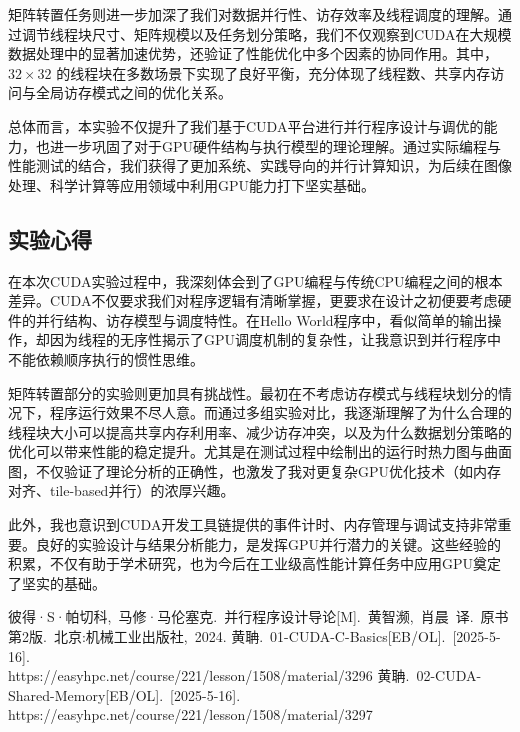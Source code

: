 \documentclass[a4paper, utf8]{ctexart}
\begin{document}
	矩阵转置任务则进一步加深了我们对数据并行性、访存效率及线程调度的理解。通过调节线程块尺寸、矩阵规模以及任务划分策略，我们不仅观察到CUDA在大规模数据处理中的显著加速优势，还验证了性能优化中多个因素的协同作用。其中，$32 \times 32$ 的线程块在多数场景下实现了良好平衡，充分体现了线程数、共享内存访问与全局访存模式之间的优化关系。
	
	总体而言，本实验不仅提升了我们基于CUDA平台进行并行程序设计与调优的能力，也进一步巩固了对于GPU硬件结构与执行模型的理论理解。通过实际编程与性能测试的结合，我们获得了更加系统、实践导向的并行计算知识，为后续在图像处理、科学计算等应用领域中利用GPU能力打下坚实基础。
	
	\subsection{实验心得}
	
	在本次CUDA实验过程中，我深刻体会到了GPU编程与传统CPU编程之间的根本差异。CUDA不仅要求我们对程序逻辑有清晰掌握，更要求在设计之初便要考虑硬件的并行结构、访存模型与调度特性。在Hello World程序中，看似简单的输出操作，却因为线程的无序性揭示了GPU调度机制的复杂性，让我意识到并行程序中不能依赖顺序执行的惯性思维。
	
	矩阵转置部分的实验则更加具有挑战性。最初在不考虑访存模式与线程块划分的情况下，程序运行效果不尽人意。而通过多组实验对比，我逐渐理解了为什么合理的线程块大小可以提高共享内存利用率、减少访存冲突，以及为什么数据划分策略的优化可以带来性能的稳定提升。尤其是在测试过程中绘制出的运行时热力图与曲面图，不仅验证了理论分析的正确性，也激发了我对更复杂GPU优化技术（如内存对齐、tile-based并行）的浓厚兴趣。
	
	此外，我也意识到CUDA开发工具链提供的事件计时、内存管理与调试支持非常重要。良好的实验设计与结果分析能力，是发挥GPU并行潜力的关键。这些经验的积累，不仅有助于学术研究，也为今后在工业级高性能计算任务中应用GPU奠定了坚实的基础。
	
	\let\cleardoublepage\clearpage
	
	\begin{thebibliography}{99}  
		 彼得·S·帕切科,\ 马修·马伦塞克.\ 并行程序设计导论[M].\ 黄智濒,\ 肖晨\ 译.\ 原书第2版.\ 北京:机械工业出版社,\ 2024.
		 黄聃.\ 01-CUDA-C-Basics[EB/OL].\ [2025-5-16].\\ https://easyhpc.net/course/221/lesson/1508/material/3296
		 黄聃.\ 02-CUDA-Shared-Memory[EB/OL].\ [2025-5-16].\\ https://easyhpc.net/course/221/lesson/1508/material/3297
	\end{thebibliography}
	
\end{document}
